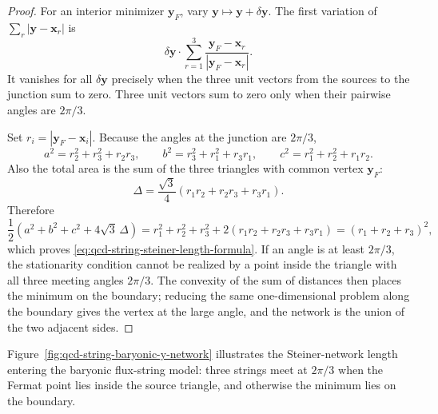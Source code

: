 \begin{proof}
For an interior minimizer \(\mathbf y_F\), vary
\(\mathbf y\mapsto \mathbf y+\delta\mathbf y\).  The first variation of
\(\sum_r|\mathbf y-\mathbf x_r|\) is
\[
  \delta\mathbf y\cdot
  \sum_{r=1}^3
  \frac{\mathbf y_F-\mathbf x_r}
       {|\mathbf y_F-\mathbf x_r|}.
\]
It vanishes for all \(\delta\mathbf y\) precisely when the three unit vectors
from the sources to the junction sum to zero.  Three unit vectors sum to zero
only when their pairwise angles are \(2\pi/3\).

Set \(r_i=|\mathbf y_F-\mathbf x_i|\).  Because the angles at the junction are
\(2\pi/3\),
\[
  a^2=r_2^2+r_3^2+r_2r_3,\qquad
  b^2=r_3^2+r_1^2+r_3r_1,\qquad
  c^2=r_1^2+r_2^2+r_1r_2 .
\]
Also the total area is the sum of the three triangles with common vertex
\(\mathbf y_F\):
\[
  \Delta
  =
  \frac{\sqrt3}{4}
  (r_1r_2+r_2r_3+r_3r_1).
\]
Therefore
\[
  \frac12(a^2+b^2+c^2+4\sqrt3\,\Delta)
  =
  r_1^2+r_2^2+r_3^2
  +2(r_1r_2+r_2r_3+r_3r_1)
  =
  (r_1+r_2+r_3)^2 ,
\]
which proves \eqref{eq:qcd-string-steiner-length-formula}.  If an angle is
at least \(2\pi/3\), the stationarity condition cannot be realized by a point
inside the triangle with all three meeting angles \(2\pi/3\).  The convexity
of the sum of distances then places the minimum on the boundary; reducing the
same one-dimensional problem along the boundary gives the vertex at the large
angle, and the network is the union of the two adjacent sides.
\end{proof}

Figure~\ref{fig:qcd-string-baryonic-y-network} illustrates the Steiner-network
length entering the baryonic flux-string model: three strings meet at
\(2\pi/3\) when the Fermat point lies inside the source triangle, and otherwise
the minimum lies on the boundary.

